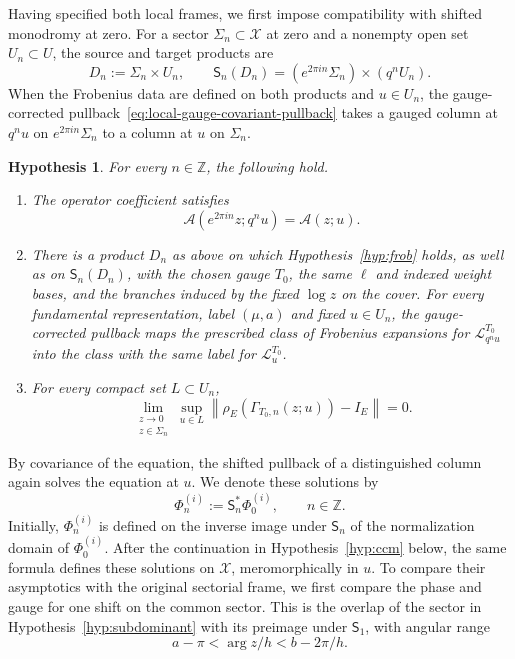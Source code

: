 \documentclass[11pt,leqno]{amsart}
\numberwithin{equation}{section}
\theoremstyle{plain}
\theoremstyle{definition}
\theoremstyle{plain}
\newtheorem{hypothesis}{Hypothesis}
\theoremstyle{definition}
\theoremstyle{remark}
\begin{document}
Having specified both local frames, we first impose compatibility with shifted monodromy at zero.  For a sector $\Sigma_n\subset\mathscr X$ at zero and a nonempty open set $U_n\subset U$, the source and target products are
\[
 D_n:=\Sigma_n\times U_n,\qquad
 \mathsf S_n(D_n)=(e^{2\pi in}\Sigma_n)\times(q^nU_n).
\]
When the Frobenius data are defined on both products and $u\in U_n$, the gauge-corrected pullback~\eqref{eq:local-gauge-covariant-pullback} takes a gauged column at $q^nu$ on $e^{2\pi in}\Sigma_n$ to a column at $u$ on $\Sigma_n$.

\begin{hypothesis}\label{hyp:symanzik}
For every $n\in\mathbb Z$, the following hold.
\begin{enumerate}[label=(\alph*),topsep=3pt,itemsep=2pt]
\item The operator coefficient satisfies
\[
 \mathscr A(e^{2\pi in}z;q^nu)=\mathscr A(z;u).
\]
\item There is a product $D_n$ as above on which Hypothesis~\ref{hyp:frob} holds, as well as on $\mathsf S_n(D_n)$, with the chosen gauge $T_0$, the same $\ell$ and indexed weight bases, and the branches induced by the fixed $\log z$ on the cover.  For every fundamental representation, label $(\mu,a)$ and fixed $u\in U_n$, the gauge-corrected pullback maps the prescribed class of Frobenius expansions for $\mathcal L_{q^nu}^{T_0}$ into the class with the same label for $\mathcal L_u^{T_0}$.
\item For every compact set $L\subset U_n$,
\[
 \lim_{\substack{z\to0\\z\in\Sigma_n}}
 \sup_{u\in L}
 \left\|\rho_{E}(\Gamma_{T_0,n}(z;u))
       -I_{E}\right\|=0.
\]
\end{enumerate}
\end{hypothesis}

By covariance of the equation, the shifted pullback of a distinguished column again solves the equation at $u$.  We denote these solutions by
\begin{equation}\label{eq:abstract-integral-orbit}
 \Phi_n^{(i)}:=\mathsf S_n^*\Phi_0^{(i)},\qquad n\in\mathbb Z.
\end{equation}
Initially, $\Phi_n^{(i)}$ is defined on the inverse image under $\mathsf S_n$ of the normalization domain of $\Phi_0^{(i)}$.  After the continuation in Hypothesis~\ref{hyp:ccm} below, the same formula defines these solutions on $\mathscr X$, meromorphically in $u$.
To compare their asymptotics with the original sectorial frame, we first compare the phase and gauge for one shift on the common sector.  This is the overlap of the sector in Hypothesis~\ref{hyp:subdominant} with its preimage under $\mathsf S_1$, with angular range
\[
 a-\pi<\arg z/h<b-2\pi/h.
\]
\end{document}

